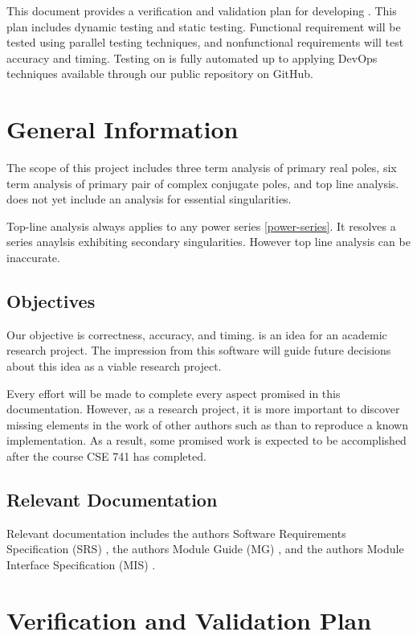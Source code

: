 \documentclass[12pt, titlepage]{article}
\begin{document}
This document provides a verification and validation plan for developing .
This plan includes dynamic testing and static testing. Functional requirement will be tested
using parallel testing techniques, and nonfunctional requirements will test accuracy and timing.
Testing on  is fully automated up to applying DevOps techniques available through
our public repository on GitHub.

\section{General Information}

The scope of this  project includes three term analysis of primary real poles,
six term analysis of primary pair of complex conjugate poles, and top line analysis.
 does not yet include an analysis for essential singularities.

Top-line analysis always applies to any power series \eqref{power-series}. It resolves
a series anaylsis exhibiting secondary singularities. However top line analysis can be
inaccurate.

\subsection{Objectives}

Our objective is correctness, accuracy, and timing.  is an idea for an academic
research project. The impression from this software will guide future decisions about
this idea as a viable research project.

Every effort will be made to complete every aspect
promised in this documentation. However, as a research project, it is more important to
discover missing elements in the work of other authors such as \cite{chang1982} than
to reproduce a known implementation. As a result, some promised work is expected to be
accomplished after the course CSE 741 has completed.

\subsection{Relevant Documentation}

Relevant documentation includes the authors Software Requirements Specification (SRS) \citep{SRS}, the
authors Module Guide (MG) \citep{MG}, and the authors Module Interface Specification (MIS) \citep{MIS}.

\section{Verification and Validation Plan}
\end{document}
